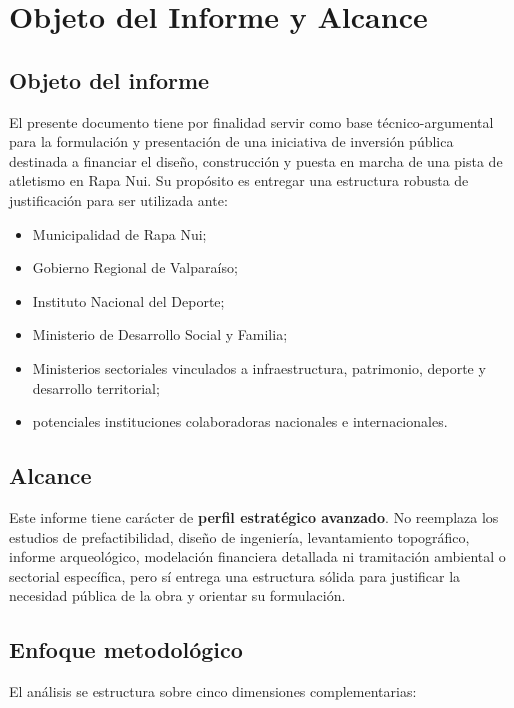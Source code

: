 \documentclass[12pt,letterpaper]{article}
\begin{document}
\section{Objeto del Informe y Alcance}

\subsection{Objeto del informe}

El presente documento tiene por finalidad servir como base técnico-argumental para la formulación y presentación de una iniciativa de inversión pública destinada a financiar el diseño, construcción y puesta en marcha de una pista de atletismo en Rapa Nui. Su propósito es entregar una estructura robusta de justificación para ser utilizada ante:

\begin{itemize}
    \item Municipalidad de Rapa Nui;
    \item Gobierno Regional de Valparaíso;
    \item Instituto Nacional del Deporte;
    \item Ministerio de Desarrollo Social y Familia;
    \item Ministerios sectoriales vinculados a infraestructura, patrimonio, deporte y desarrollo territorial;
    \item potenciales instituciones colaboradoras nacionales e internacionales.
\end{itemize}

\subsection{Alcance}

Este informe tiene carácter de \textbf{perfil estratégico avanzado}. No reemplaza los estudios de prefactibilidad, diseño de ingeniería, levantamiento topográfico, informe arqueológico, modelación financiera detallada ni tramitación ambiental o sectorial específica, pero sí entrega una estructura sólida para justificar la necesidad pública de la obra y orientar su formulación.

\subsection{Enfoque metodológico}

El análisis se estructura sobre cinco dimensiones complementarias:
\end{document}
